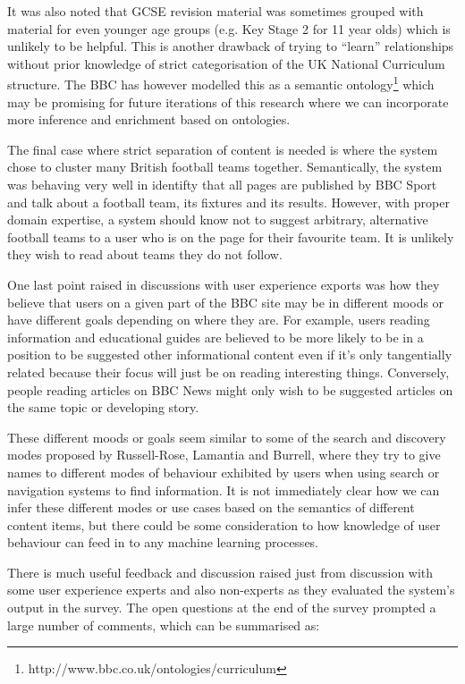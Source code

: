 It was also noted
that GCSE revision material was sometimes grouped with material for
even younger age groups (e.g. Key Stage 2 for 11 year olds) which
is unlikely to be helpful. This is another drawback of trying to
``learn'' relationships without prior knowledge of strict categorisation
of the UK National Curriculum structure. The BBC has however modelled
this as a semantic ontology\footnote{http://www.bbc.co.uk/ontologies/curriculum}
which may be promising for future iterations of this research where
we can incorporate more inference and enrichment based on
ontologies.

The final case where strict separation of content is needed is where
the system chose to cluster many British football teams together.
Semantically, the system was behaving very well in identifty that
all pages are published by BBC Sport and talk about a football team,
its fixtures and its results. However, with proper domain expertise,
a system should know not to suggest arbitrary, alternative football
teams to a user who is on the page for their favourite team. It is
unlikely they wish to read about teams they do not follow.

One last point raised in discussions with user experience exports was
how they believe that users on a given part of the BBC site may be
in different moods or have different goals depending on where they
are. For example, users reading information and educational guides
are believed to be more likely to be in a position to be suggested
other informational content even if it's only tangentially related
because their focus will just be on reading interesting things.
Conversely, people reading articles on BBC News might only wish to
be suggested articles on the same topic or developing story.

These different moods or goals seem similar to some of the search
and discovery modes proposed by Russell-Rose, Lamantia
and Burrell\cite{russell2011taxonomy}, where they try to give names
to different modes of behaviour exhibited by users when using search
or navigation systems to find information. It is not immediately clear
how we can infer these different modes or use cases based on
the semantics of different content items, but there could be some
consideration to how knowledge of user behaviour can feed in to
any machine learning processes.

There is much useful feedback and discussion raised just from
discussion with some user experience experts and also non-experts as
they evaluated the system's output in the survey. The open questions
at the end of the survey prompted a large number of comments, which
can be summarised as:

